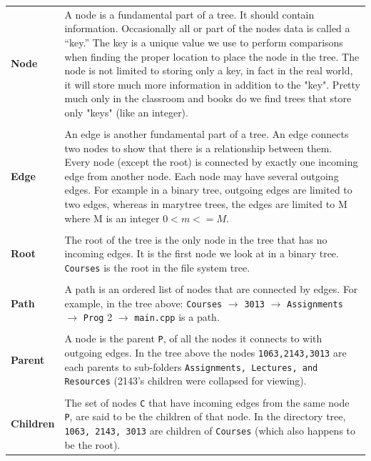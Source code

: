 \begin{center}
	\begin{tabular}{p{} p{} }
		
		\textbf{Node}      &   
		A node is a fundamental part of a tree. It should contain information. Occasionally 
		all or part of the nodes data is called a  ``key.''  The key is a unique value we 
		use to perform comparisons when finding the proper location to place the node in the 
		tree. The node is not limited to storing only a key, in fact in the real world, it will
		store much more information in addition to the "key". Pretty much only in the classroom and
		books do we find trees that store  only "keys" (like an integer).\\
		\\
		\textbf{Edge}      &   
		An edge is another fundamental part of a tree. An edge connects two
		nodes to show that there is a relationship between them. Every node
		(except the root) is connected by exactly one incoming edge from
		another node. Each node may have several outgoing edges. For example
		in a binary tree, outgoing edges are limited to two edges, whereas in
		\gls{marytree} trees, the edges are limited to M where M is an integer $0 < m <= M$.\\
		\\
		\textbf{Root}      &   
		The root of the tree is the only node in the tree that has no
		incoming edges. It is the first node we look at in a binary tree. 
		\texttt{Courses} is the root in the file system tree.\\
		\\
		\textbf{Path}      &   
		A path is an ordered list of nodes that are connected by edges. For
		example, in the tree above: \texttt{Courses} $\rightarrow$ \texttt{3013}
		$\rightarrow$ \texttt{Assignments} $\rightarrow$ \texttt{Prog} 2 $\rightarrow$ \texttt{main.cpp} is a path.\\
		\\
		\textbf{Parent}    &   
		A node is the parent \texttt{P}, of all the nodes it connects to with outgoing
		edges. In the tree above the nodes \texttt{1063,2143,3013} are each parents to sub-folders \texttt{Assignments, Lectures, and Resources} (2143's children were collapsed for viewing).\\
		\\
		\textbf{Children}  &   
		The set of nodes \texttt{C} that have incoming edges from the same node \texttt{P},
		are said to be the children of that node. In the directory tree, \texttt{1063, 2143, 3013} are children of \texttt{Courses} (which also happens to be the root).\\

\end{tabular}
\end{center}
